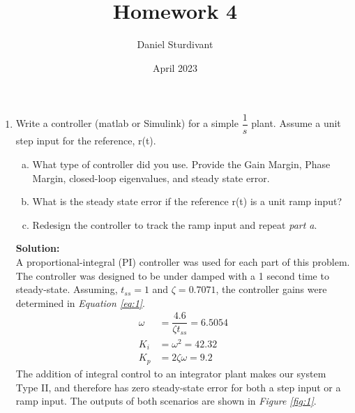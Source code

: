 \documentclass[10pt]{article}
\author{Daniel Sturdivant}
\title{Homework 4}
\date{April 2023}
\newcommand{\solution}{\textbf{Solution: \\}}
\begin{document}
\maketitle
\thispagestyle{fancy}
\setlength{\parindent}{0pt}

\begin{enumerate}[label=\textbf{\arabic*.}]
  \itemsep 24pt
  
  \item Write a controller (matlab or Simulink) for a simple $\dfrac{1}{s}$ 
  plant. Assume a unit step input for the reference, r(t).
  \begin{enumerate}[(a)]
    \itemsep -2pt
    \item What type of controller did you use. Provide the Gain Margin, Phase 
    Margin, closed-loop eigenvalues, and steady state error.
    \item What is the steady state error if the reference r(t) is a unit ramp 
    input?
    \item Redesign the controller to track the ramp input and repeat 
    \emph{part a}.
  \end{enumerate}
  \solution
  A proportional-integral (PI) controller was used for each part of this 
  problem. The controller was designed to be under damped with a 1 second time 
  to steady-state. Assuming, $t_{ss} = 1$ and $\zeta = 0.7071$, the controller 
  gains were determined in \emph{Equation \ref{eq:1}}.
  \begin{equation}
    \begin{split}
      \omega &= \dfrac{4.6}{\zeta t_{ss}} = 6.5054 \\
      K_i &= \omega^2 = 42.32 \\
      K_p &= 2 \zeta \omega = 9.2
    \end{split}
    \label{eq:1}
  \end{equation}
  The addition of integral control to an integrator plant makes our system Type 
  II, and therefore has zero steady-state error for both a step input or a ramp 
  input. The outputs of both scenarios are shown in \emph{Figure \ref{fig:1}}.
  \begin{figure}[H]
    \centering
    \begin{subfigure}{0.5\textwidth}
      \centering

\end{subfigure}
\end{figure}
\end{enumerate}
\end{document}
